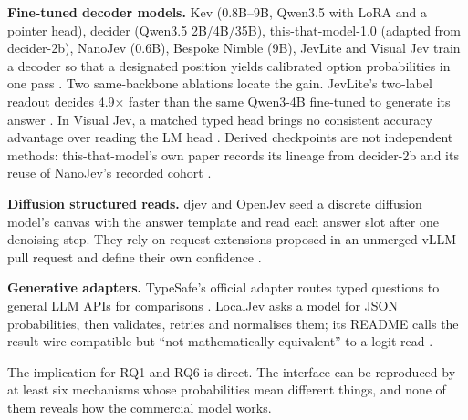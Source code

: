 \textbf{Fine-tuned decoder models.} Kev (0.8B–9B, Qwen3.5 with LoRA and a pointer head), decider (Qwen3.5 2B/4B/35B), this-that-model-1.0 (adapted from decider-2b), NanoJev (0.6B), Bespoke Nimble (9B), JevLite and Visual Jev train a decoder so that a designated position yields calibrated option probabilities in one pass \citep{gh_jaredpalmer_kev,gh_mapika_decider,arxiv2609_23886,gh_tianyucodings_nanojev,gh_bespokelabsai_nimble,arxiv2609_23959,arxiv2609_25845}. Two same-backbone ablations locate the gain. JevLite's two-label readout decides 4.9× faster than the same Qwen3-4B fine-tuned to generate its answer \citep{arxiv2609_23959}. In Visual Jev, a matched typed head brings no consistent accuracy advantage over reading the LM head \citep{arxiv2609_25845}. Derived checkpoints are not independent methods: this-that-model's own paper records its lineage from decider-2b and its reuse of NanoJev's recorded cohort \citep{arxiv2609_23886}.

\textbf{Diffusion structured reads.} djev and OpenJev seed a discrete diffusion model's canvas with the answer template and read each answer slot after one denoising step. They rely on request extensions proposed in an unmerged vLLM pull request and define their own confidence \citep{gh_mmastrac_djev,gh_razorback16_openjev}.

\textbf{Generative adapters.} TypeSafe's official adapter routes typed questions to general LLM APIs for comparisons \citep{gh_typesafe_ai_system_one_adapter_python}. LocalJev asks a model for JSON probabilities, then validates, retries and normalises them; its README calls the result wire-compatible but “not mathematically equivalent” to a logit read \citep{gh_githubnext_localjev}.

The implication for RQ1 and RQ6 is direct. The interface can be reproduced by at least six mechanisms whose probabilities mean different things, and none of them reveals how the commercial model works.
